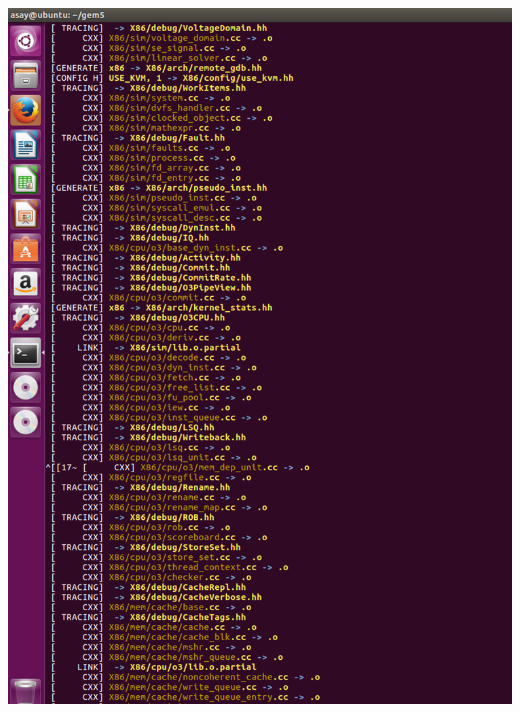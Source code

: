 \documentclass{article}
\begin{document}
\begin{center}
	\includegraphics[width=1\textwidth]{build1}

\end{center}
\end{document}
